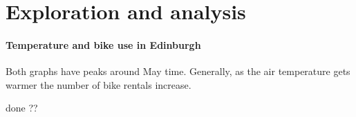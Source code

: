 \documentclass[11pt,a4paper]{article}
\begin{document}
\section{Exploration and  analysis}

\paragraph{Temperature and bike use in Edinburgh}



Both graphs have peaks around May time.
Generally, as the air temperature gets warmer the number of bike rentals increase.


%

done
%
% 
??

\end{document}
